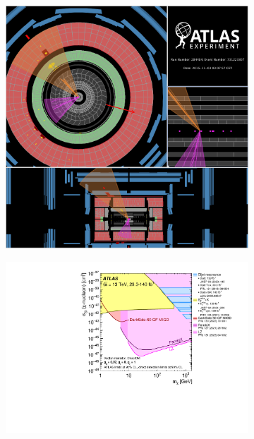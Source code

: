 \begin{figure}[!ht]
     \centering
     \begin{subfigure}{0.42\textwidth}
         \centering
         \includegraphics[width=\textwidth]{figures/DMOverview/MonoXEventViewer.png}
         \caption[An event from a Mono-Higgs search from the ATLAS detector at the LHC.]{}
         \label{fig:DMOverview/Mono-XEventViewer}
     \end{subfigure}
     \hfill
     \begin{subfigure}{0.56\textwidth}
         \centering
         \includegraphics[width=\textwidth]{figures/DMOverview/ATLASDMSearch.pdf}

\end{subfigure}
\end{figure}
